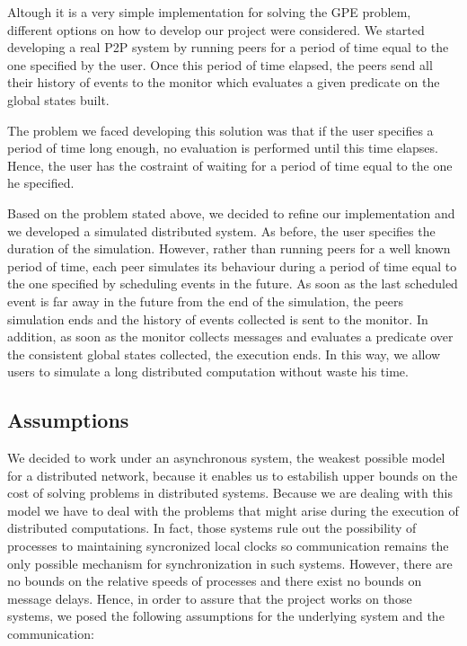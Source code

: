 \documentclass[11pt]{article}
\begin{document}
Altough it is a very simple implementation for solving the GPE problem, different options on how to develop our project were considered. We started developing a real P2P system by running peers for a period of time equal to the one specified by the user. Once this period of time elapsed, the peers send all their history of events to the monitor which evaluates a given predicate on the global states built.

The problem we faced developing this solution was that if the user specifies a period of time long enough, no evaluation is performed until this time elapses. Hence, the user has the costraint of waiting for a period of time equal to the one he specified.

Based on the problem stated above, we decided to refine our implementation and we developed a simulated distributed system. As before, the user specifies the duration of the simulation. However, rather than running peers for a well known period of time, each peer simulates its behaviour during a period of time equal to the one specified by scheduling events in the future. As soon as the last scheduled event is far away in the future from the end of the simulation, the peers simulation ends and the history of events collected is sent to the monitor. In addition, as soon as the monitor collects messages and evaluates a predicate over the consistent global states collected, the execution ends. In this way, we allow users to simulate a long distributed computation without waste his time.

\subsection{Assumptions}

We decided to work under an asynchronous system, the weakest possible model for a distributed network, because it enables us to estabilish upper bounds on the cost of solving problems in distributed systems\cite{Babaoglu}. Because we are dealing with this model we have to deal with the problems that might arise during the execution of distributed computations. In fact, those systems rule out the possibility of processes to maintaining syncronized local clocks so communication remains the only possible mechanism for synchronization in such systems. However, there are no bounds on the relative speeds of processes and there exist no bounds on message delays. Hence, in order to assure that the project works on those systems, we posed the following assumptions for the underlying system and the communication:
\end{document}
